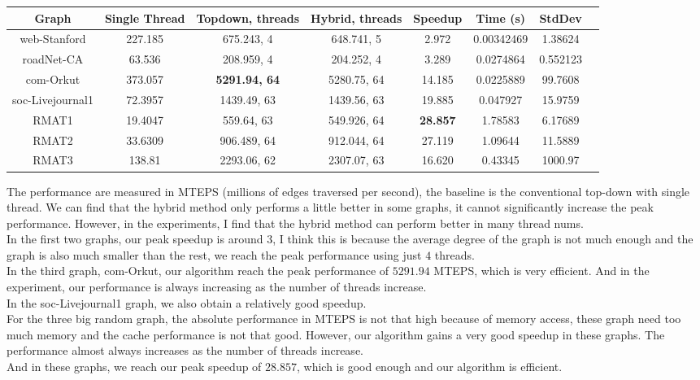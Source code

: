 \documentclass[10pt,twocolumn,letterpaper]{article}
\begin{document}
\begin{strip}
\centering
\begin{tabular}{@{}c|ccccccc@{}}
\toprule
Graph            & Single Thread  & Topdown, threads     & Hybrid, threads      & Speedup & Time (s) & StdDev \\ \midrule
web-Stanford     & 227.185 & 675.243, 4  & 648.741, 5  & 2.972 & 0.00342469 & 1.38624    \\
roadNet-CA       & 63.536  & 208.959, 4  & 204.252, 4  & 3.289  & 0.0274864 & 0.552123 \\
com-Orkut        & 373.057 & \textbf{5291.94, 64} & 5280.75, 64 & 14.185 & 0.0225889 & 99.7608 \\
soc-Livejournal1 & 72.3957 & 1439.49, 63 & 1439.56, 63 & 19.885 & 0.047927 & 15.9759 \\
RMAT1            & 19.4047 & 559.64, 63  & 549.926, 64 & \textbf{28.857} & 1.78583 & 6.17689  \\
RMAT2            & 33.6309 &    906.489, 64         &   912.044, 64          &   27.119 & 1.09644 & 11.5889      \\
RMAT3            &    138.81     & 2293.06, 62            & 2307.07, 63            &16.620 & 0.43345 & 1000.97         \\ \bottomrule
\end{tabular}

\end{strip}

The performance are measured in MTEPS (millions of edges traversed per second), the baseline is the conventional top-down with single thread. We can find that the hybrid method only performs a little better in some graphs, it cannot significantly increase the peak performance. However, in the experiments, I find that the hybrid method can perform better in many thread nums.\\
In the first two graphs, our peak speedup is around $3$, I think this is because the average degree of the graph is not much enough and the graph is also much smaller than the rest, we reach the peak performance using just $4$ threads.\\
In the third graph, com-Orkut, our algorithm reach the peak performance of $5291.94$ MTEPS, which is very efficient. And in the experiment, our performance is always increasing as the number of threads increase.\\
In the soc-Livejournal1 graph, we also obtain a relatively good speedup.\\
For the three big random graph, the absolute performance in MTEPS is not that high because of memory access, these graph need too much memory and the cache performance is not that good. However, our algorithm gains a very good speedup in these graphs. The performance almost always increases as the number of threads increase.\\
And in these graphs, we reach our peak speedup of $28.857$, which is good enough and our algorithm is efficient.
\end{document}
